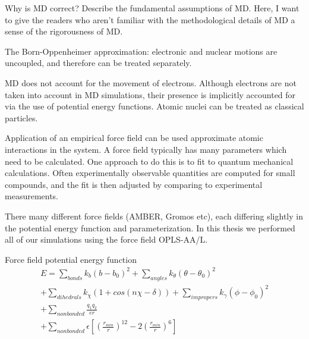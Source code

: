 \begin{outline}
	\1 Why is MD correct? Describe the fundamental assumptions of MD. Here, I want to give the readers who aren't familiar with the methodological details of MD a sense of the rigorousness of MD.
	
	\1 The Born-Oppenheimer approximation: electronic and nuclear motions are uncoupled, and therefore can be treated separately. 

	\1 MD does not account for the movement of electrons. Although electrons are not taken into account in MD simulations, their presence is implicitly accounted for via the use of potential energy functions.  Atomic nuclei can be treated as classical particles.



  \1 Application of an empirical force field can be used approximate atomic interactions in the system. A force field typically has many parameters which need to be calculated. One approach to do this is to fit to quantum mechanical calculations.  Often experimentally observable quantities are computed for small compounds, and the fit is then adjusted by comparing to experimental measurements.
  
  \1 There many different force fields (AMBER, Gromos etc), each differing slightly in the potential energy function and parameterization. In this thesis we performed all of our simulations using the force field OPLS-AA/L.

  \1 Force field potential energy function
  \begin{equation}
    \begin{split}
          E = \sum_{bonds} k_b(b-b_0)^2 
          + \sum_{angles} k_{\theta}(\theta - \theta_{0})^2 \\
          + \sum_{dihedrals} k_{\chi}(1 + cos(n\chi - \delta)) 
          + \sum_{impropers} k_{\gamma}(\phi - \phi_{0})^2 \\
          + \sum_{nonbonded} \frac{q_1q_2}{er} \\
          + \sum_{nonbonded} \epsilon [(\frac{r_{min}}{r})^{12} - 2(\frac{r_{min}}{r})^6]
    \end{split}    
  \end{equation}


\end{outline}
